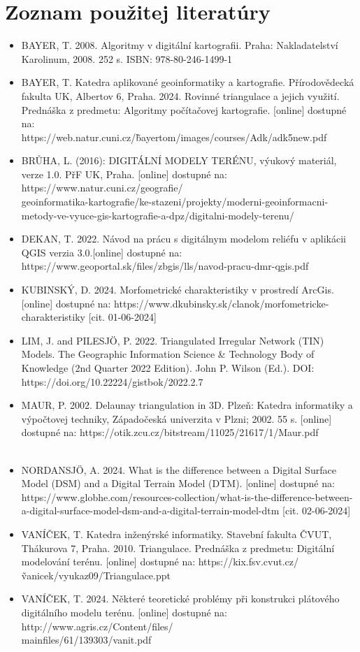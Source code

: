 \documentclass[12pt]{article}
\begin{document}
\section*{Zoznam použitej literatúry}
\begin{itemize}
       
    \item BAYER, T. 2008. Algoritmy v digitální kartografii. Praha: Nakladatelství Karolinum, 2008. 252 s. ISBN: 978-80-246-1499-1
    \item BAYER, T. Katedra aplikované geoinformatiky a kartografie. Přírodovědecká fakulta UK, Albertov 6, Praha. 2024. Rovinné triangulace a jejich využití. Prednáška z predmetu: Algoritmy počítačovej kartografie. [online] dostupné na: \\https://web.natur.cuni.cz/\~bayertom/images/courses/Adk/adk5\textunderscore new.pdf 
    \item BRŮHA, L. (2016): DIGITÁLNÍ MODELY TERÉNU, výukový materiál, verze 1.0. PřF UK, Praha. [online] dostupné na: https://www.natur.cuni.cz/geografie/\\geoinformatika-kartografie/ke-stazeni/projekty/moderni-geoinformacni-metody-ve-vyuce-gis-kartografie-a-dpz/digitalni-modely-terenu/
    \item DEKAN, T. 2022. Návod na prácu s digitálnym modelom reliéfu v aplikácii QGIS
    verzia 3.0.[online] dostupné na: https://www.geoportal.sk/files/zbgis/lls/navod-pracu-dmr-qgis.pdf

    \item KUBINSKÝ, D. 2024. Morfometrické charakteristiky v prostredí ArcGis. [online] dostupné na: https://www.dkubinsky.sk/clanok/morfometricke-charakteristiky [cit. 01-06-2024]
    \item LIM, J. and PILESJÖ, P. 2022. Triangulated Irregular Network (TIN) Models. The Geographic Information Science & Technology Body of Knowledge (2nd Quarter 2022 Edition). John P. Wilson (Ed.).  DOI: https://doi.org/10.22224/gistbok/2022.2.7
    \item MAUR, P. 2002. Delaunay triangulation in 3D. Plzeň: Katedra informatiky a výpočtovej techniky, Západočeská univerzita v Plzni; 2002. 55 s. [online] dostupné na: https://otik.zcu.cz/bitstream/11025/21617/1/Maur.pdf \\\\
    \item NORDANSJÖ, A. 2024. What is the difference between a Digital Surface Model (DSM) and a Digital Terrain Model (DTM). [online] dostupné na: https://www.globhe.com/resources-collection/what-is-the-difference-between-a-digital-surface-model-dsm-and-a-digital-terrain-model-dtm [cit. 02-06-2024] 
    \item VANÍČEK, T. Katedra inženýrské informatiky. Stavební fakulta ČVUT, Thákurova 7, Praha. 2010. Triangulace. Prednáška z predmetu: Digitální modelování terénu. [online] dostupné na: https://kix.fsv.cvut.cz/\~vanicek/vyuka\textunderscore z09/Triangulace.ppt 
    \item VANÍČEK, T. 2024. Některé teoretické problémy při konstrukci plátového digitálního modelu terénu. [online] dostupné na: http://www.agris.cz/Content/files/\\main\textunderscore files/61/139303/vanit.pdf 
    

\end{itemize}
\end{document}
